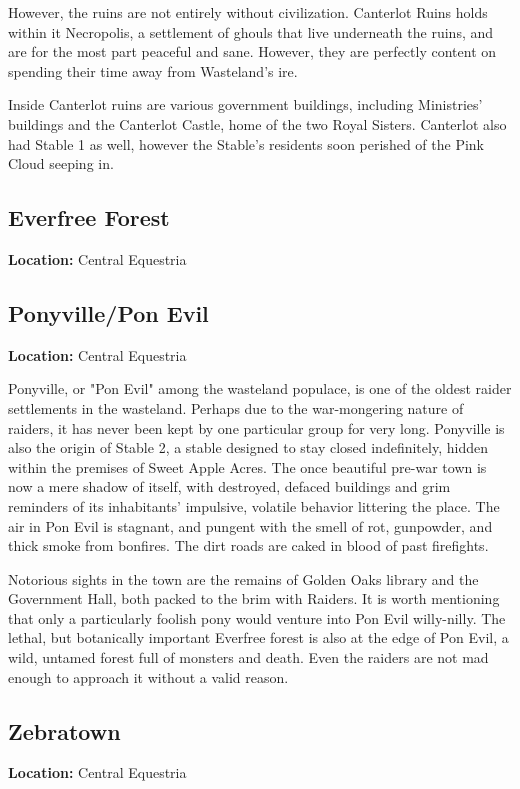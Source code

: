 \documentclass[11pt,a4paper,twocolumn]{book}
\begin{document}
    However, the ruins are not entirely without civilization. Canterlot Ruins holds within it Necropolis, a settlement of ghouls that live underneath the ruins, and are for the most part peaceful and sane. However, they are perfectly content on spending their time away from Wasteland's ire.
    
    Inside Canterlot ruins are various government buildings, including Ministries' buildings and the Canterlot Castle, home of the two Royal Sisters. Canterlot also had Stable 1 as well, however the Stable's residents soon perished of the Pink Cloud seeping in.
    
    \subsection*{Everfree Forest}
    \textbf{Location:} Central Equestria
    
    \subsection*{Ponyville/Pon Evil}
    \textbf{Location:} Central Equestria
    
    Ponyville, or "Pon Evil" among the wasteland populace, is one of the oldest raider settlements in the wasteland. Perhaps due to the war-mongering nature of raiders, it has never been kept by one particular group for very long. Ponyville is also the origin of Stable 2, a stable designed to stay closed indefinitely, hidden within the premises of Sweet Apple Acres.
    The once beautiful pre-war town is now a mere shadow of itself, with destroyed, defaced buildings and grim reminders of its inhabitants' impulsive, volatile behavior littering the place. The air in Pon Evil is stagnant, and pungent with the smell of rot, gunpowder, and thick smoke from bonfires. The dirt roads are caked in blood of past firefights. 
    
    Notorious sights in the town are the remains of Golden Oaks library and the Government Hall, both packed to the brim with Raiders. It is worth mentioning that only a particularly foolish pony would venture into Pon Evil willy-nilly. The lethal, but botanically important Everfree forest is also at the edge of Pon Evil, a wild, untamed forest full of monsters and death. Even the raiders are not mad enough to approach it without a valid reason.
    
    \subsection*{Zebratown}
    \textbf{Location:} Central Equestria
    
\end{document}
